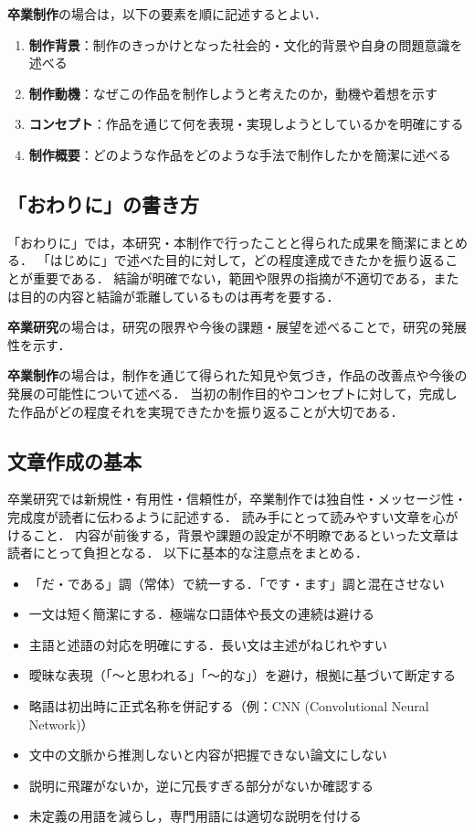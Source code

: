 \textbf{卒業制作}の場合は，以下の要素を順に記述するとよい．
\begin{enumerate}
    \item \textbf{制作背景}：制作のきっかけとなった社会的・文化的背景や自身の問題意識を述べる
    \item \textbf{制作動機}：なぜこの作品を制作しようと考えたのか，動機や着想を示す
    \item \textbf{コンセプト}：作品を通じて何を表現・実現しようとしているかを明確にする
    \item \textbf{制作概要}：どのような作品をどのような手法で制作したかを簡潔に述べる
\end{enumerate}

\subsection{「おわりに」の書き方}
\label{subsec:conclusion-writing}
「おわりに」では，本研究・本制作で行ったことと得られた成果を簡潔にまとめる．
「はじめに」で述べた目的に対して，どの程度達成できたかを振り返ることが重要である．
結論が明確でない，範囲や限界の指摘が不適切である，または目的の内容と結論が乖離しているものは再考を要する．

\textbf{卒業研究}の場合は，研究の限界や今後の課題・展望を述べることで，研究の発展性を示す．

\textbf{卒業制作}の場合は，制作を通じて得られた知見や気づき，作品の改善点や今後の発展の可能性について述べる．
当初の制作目的やコンセプトに対して，完成した作品がどの程度それを実現できたかを振り返ることが大切である．

\subsection{文章作成の基本}
\label{subsec:writing-tips}
卒業研究では新規性・有用性・信頼性が，卒業制作では独自性・メッセージ性・完成度が読者に伝わるように記述する\cite{kisaragi}．
読み手にとって読みやすい文章を心がけること．
内容が前後する，背景や課題の設定が不明瞭であるといった文章は読者にとって負担となる．
以下に基本的な注意点をまとめる．
\begin{itemize}
    \item 「だ・である」調（常体）で統一する．「です・ます」調と混在させない
    \item 一文は短く簡潔にする．極端な口語体や長文の連続は避ける
    \item 主語と述語の対応を明確にする．長い文は主述がねじれやすい
    \item 曖昧な表現（「〜と思われる」「〜的な」）を避け，根拠に基づいて断定する
    \item 略語は初出時に正式名称を併記する（例：CNN (Convolutional Neural Network)）
    \item 文中の文脈から推測しないと内容が把握できない論文にしない
    \item 説明に飛躍がないか，逆に冗長すぎる部分がないか確認する
    \item 未定義の用語を減らし，専門用語には適切な説明を付ける
\end{itemize}


